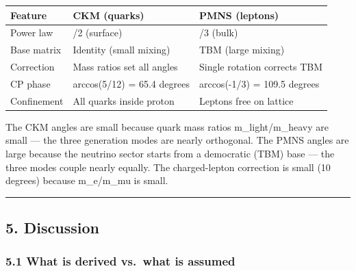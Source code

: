 \documentclass[
]{article}
\newcounter{none} %
\begin{document}
{\def\LTcaptype{none} %
\begin{longtable}[]{@{}
  >{\raggedright\arraybackslash}p{}
  >{\raggedright\arraybackslash}p{}
  >{\raggedright\arraybackslash}p{}@{}}
\toprule\noalign{}
\begin{minipage}[b]{\linewidth}\raggedright
Feature
\end{minipage} & \begin{minipage}[b]{\linewidth}\raggedright
CKM (quarks)
\end{minipage} & \begin{minipage}[b]{\linewidth}\raggedright
PMNS (leptons)
\end{minipage} \\
\midrule\noalign{}
\endhead
\bottomrule\noalign{}
\endlastfoot
Power law & 1/2 (surface) & 1/3 (bulk) \\
Base matrix & Identity (small mixing) & TBM (large mixing) \\
Correction & Mass ratios set all angles & Single rotation corrects
TBM \\
CP phase & arccos(5/12) = 65.4 degrees & arccos(-1/3) = 109.5 degrees \\
Confinement & All quarks inside proton & Leptons free on lattice \\
\end{longtable}
}

The CKM angles are small because quark mass ratios m\_light/m\_heavy are
small --- the three generation modes are nearly orthogonal. The PMNS
angles are large because the neutrino sector starts from a democratic
(TBM) base --- the three modes couple nearly equally. The charged-lepton
correction is small (10 degrees) because m\_e/m\_mu is small.

\begin{center}\rule{0.5\linewidth}{0.5pt}\end{center}

\subsection{5. Discussion}\label{discussion}

\subsubsection{5.1 What is derived vs.~what is
assumed}\label{what-is-derived-vs.-what-is-assumed}
\end{document}
